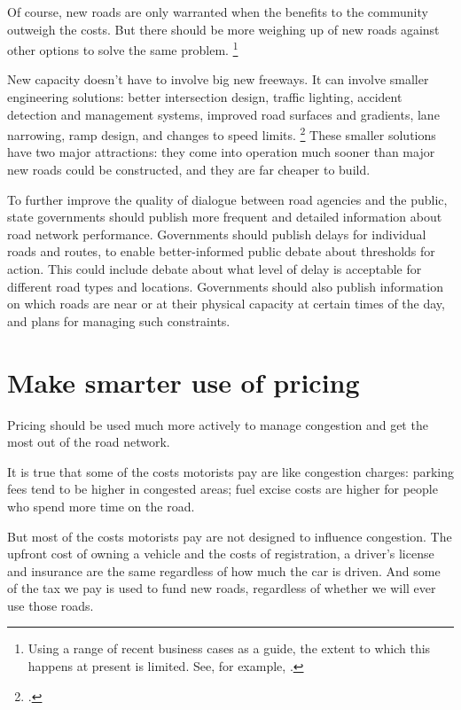 \documentclass{grattan}
\begin{document}
Of course, new roads are only warranted when the benefits to the community outweigh the costs. But there should be more weighing up of new roads against other options to solve the same problem.%
\footnote{Using a range of recent business cases as a guide, the extent to which this happens at present is limited.
See, for example, \textcite{SGS2016WestConnexreview}.}

New capacity doesn't have to involve big new freeways. It can involve smaller engineering solutions: better intersection design, traffic lighting, accident detection and management systems, improved road surfaces and gradients, lane narrowing, ramp design, and changes to speed limits.
\footcites[][14]{Arnott-Alternatives-to-road-pricing}[][28]{2016-Bertaud}[][29]{2009-queue-duckers}
These smaller solutions have two major attractions: they come into operation much sooner than major new roads could be constructed, and they are far cheaper to build.

To further improve the quality of dialogue between road agencies and the public, state governments should publish more frequent and detailed information about road network performance.
Governments should publish delays for individual roads and routes, to enable better-informed public debate about thresholds for action.
This could include debate about what level of delay is acceptable for different road types and locations.
Governments should also publish information on which roads are near or at their physical capacity at certain times of the day, and plans for managing such constraints.

\section{Make smarter use of pricing}

Pricing should be used much more actively to manage congestion and get the most out of the road network.

It is true that some of the costs motorists pay are like congestion charges: parking fees tend to be higher in congested areas; fuel excise costs are higher for people who spend more time on the road.

But most of the costs motorists pay are not designed to influence congestion.
The upfront cost of owning a vehicle and the costs of registration, a driver's license and insurance are the same regardless of how much the car is driven.
And some of the tax we pay is used to fund new roads, regardless of whether we will ever use those roads.
\end{document}
